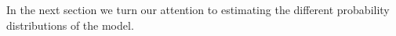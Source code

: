 

In the next section we turn our attention to estimating the different
probability distributions of the model.
